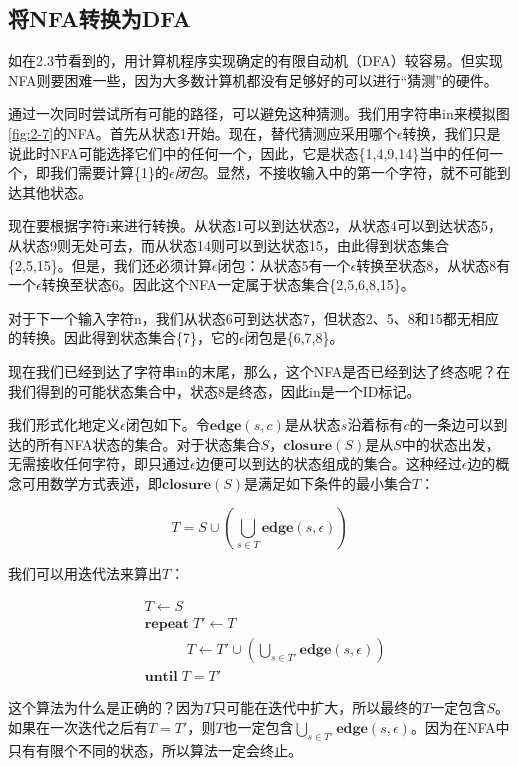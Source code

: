\documentclass[cn,11pt,chinese]{elegantbook}
\begin{document}
\subsection{将NFA转换为DFA}

如在2.3节看到的，用计算机程序实现确定的有限自动机（DFA）较容易。但实现NFA则要困难一些，因为大多数计算机都没有足够好的可以进行“猜测”的硬件。

通过一次同时尝试所有可能的路径，可以避免这种猜测。我们用字符串in来模拟图\ref{fig:2-7}的NFA。首先从状态1开始。现在，替代猜测应采用哪个$\epsilon$转换，我们只是说此时NFA可能选择它们中的任何一个，因此，它是状态\{1,4,9,14\}当中的任何一个，即我们需要计算\{1\}的$\epsilon$\textit{闭包}。显然，不接收输入中的第一个字符，就不可能到达其他状态。

现在要根据字符i来进行转换。从状态1可以到达状态2，从状态4可以到达状态5，从状态9则无处可去，而从状态14则可以到达状态15，由此得到状态集合\{2,5,15\}。但是，我们还必须计算$\epsilon$闭包：从状态5有一个$\epsilon$转换至状态8，从状态8有一个$\epsilon$转换至状态6。因此这个NFA一定属于状态集合\{2,5,6,8,15\}。

对于下一个输入字符n，我们从状态6可到达状态7，但状态2、5、8和15都无相应的转换。因此得到状态集合\{7\}，它的$\epsilon$闭包是\{6,7,8\}。

现在我们已经到达了字符串in的末尾，那么，这个NFA是否已经到达了终态呢？在我们得到的可能状态集合中，状态8是终态，因此in是一个ID标记。

我们形式化地定义$\epsilon$闭包如下。令$\textbf{edge}(s,c)$是从状态$s$沿着标有$c$的一条边可以到达的所有NFA状态的集合。对于状态集合$S$，$\textbf{closure}(S)$是从$S$中的状态出发，无需接收任何字符，即只通过$\epsilon$边便可以到达的状态组成的集合。这种经过$\epsilon$边的概念可用数学方式表述，即$\textbf{closure}(S)$是满足如下条件的最小集合$T$：

$$
T = S \cup (\bigcup_{s \in T} \textbf{edge}(s,\epsilon))
$$

我们可以用迭代法来算出$T$：

\begin{align*}
& T \leftarrow S \\
& \textbf{repeat} \; T' \leftarrow T \\
&    \quad\quad\quad T  \leftarrow T' \cup (\bigcup_{s \in T'} \textbf{edge}(s,\epsilon)) \\
& \textbf{until} \; T = T'
\end{align*}

这个算法为什么是正确的？因为$T$只可能在迭代中扩大，所以最终的$T$一定包含$S$。如果在一次迭代之后有$T=T'$，则$T$也一定包含$\bigcup_{s \in T'} \textbf{edge}(s,\epsilon)$。因为在NFA中只有有限个不同的状态，所以算法一定会终止。
\end{document}
